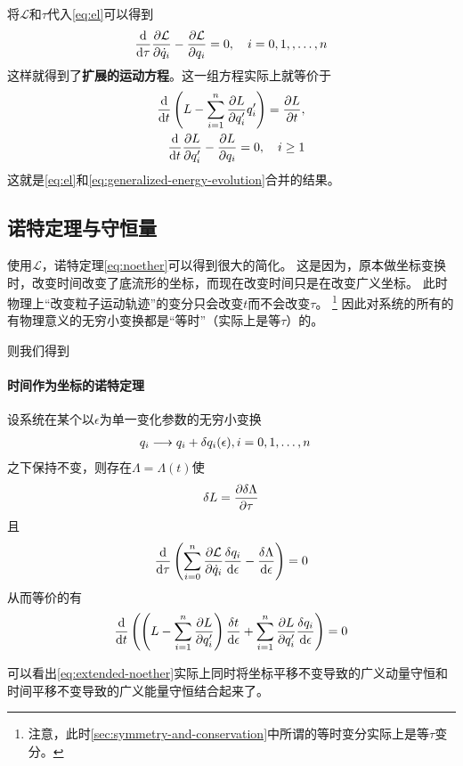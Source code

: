 \documentclass[UTF8, a4paper]{ctexart}
\begin{document}
将$\mathcal{L}$和$\tau$代入\eqref{eq:el}可以得到
\begin{equation}
    \dv{\tau} \pdv{\mathcal{L}}{\dot{q}_i} - \pdv{\mathcal{L}}{q_i} = 0, \quad i = 0, 1, ,\ldots, n
\end{equation}
这样就得到了\textbf{扩展的运动方程}。这一组方程实际上就等价于
\[
    \begin{split}
        \dv{t} \left( L - \sum_{i=1}^n \pdv{L}{q_i'} q_i' \right) = \pdv{L}{t}, \\
        \dv{t} \pdv{L}{q_i'} - \pdv{L}{q_i} = 0, \quad i \geq 1
    \end{split}
\]
这就是\eqref{eq:el}和\eqref{eq:generalized-energy-evolution}合并的结果。

\subsection{诺特定理与守恒量}

使用$\mathcal{L}$，诺特定理\eqref{eq:noether}可以得到很大的简化。
这是因为，原本做坐标变换时，改变时间改变了底流形的坐标，而现在改变时间只是在改变广义坐标。
此时物理上“改变粒子运动轨迹”的变分只会改变$t$而不会改变$\tau$。%
\footnote{注意，此时\ref{sec:symmetry-and-conservation}中所谓的等时变分实际上是等$\tau$变分。}
因此对系统的所有的有物理意义的无穷小变换都是“等时”（实际上是等$\tau$）的。

则我们得到
\paragraph{时间作为坐标的诺特定理} 设系统在某个以$\epsilon$为单一变化参数的无穷小变换
\[
    \begin{aligned}
        q_i &\longrightarrow q_i + \var q_i(\epsilon), i = 0, 1, \ldots, n
    \end{aligned}
\]
之下保持不变，则存在$\Lambda=\Lambda(t)$使
\[
    \var L = \frac{\partial \var \Lambda}{\partial \tau} 
\]
且
\begin{equation}
    \dv{\tau} \left(\sum_{i=0}^n \pdv{\mathcal{L}}{\dot{q}_i} \frac{\var q_i}{\dd \epsilon} - \frac{\var \Lambda}{\dd \epsilon} \right) = 0
    \label{eq:extended-noether}
\end{equation}
从而等价的有
\[
    \dv{t} \left(\left(L - \sum_{i=1}^n \pdv{L}{q_i'}\right) \frac{\var t}{\dd \epsilon} + \sum_{i=1}^n \pdv{L}{q_i'} \frac{\var q_i}{\dd \epsilon}\right) = 0
\]

可以看出\eqref{eq:extended-noether}实际上同时将坐标平移不变导致的广义动量守恒和时间平移不变导致的广义能量守恒结合起来了。
\end{document}
